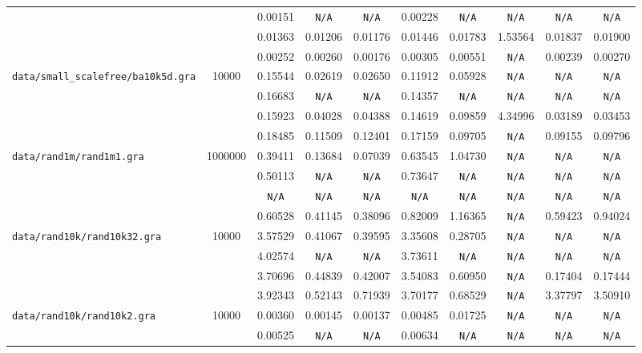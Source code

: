 \documentclass[12pt,a4paper,twoside]{article}
\begin{document}
{\begin{tabular}{ | l | c | c | c | c | c | c | c | c | c | }
\verb| | &  & 0.00151 & \verb|N/A| & \verb|N/A| & 0.00228 & \verb|N/A| & \verb|N/A| & \verb|N/A| & \verb|N/A| \\
\verb| | &  & 0.01363 & 0.01206 & 0.01176 & 0.01446 & 0.01783 & 1.53564 & 0.01837 & 0.01900 \\
\verb| | &  & 0.00252 & 0.00260 & 0.00176 & 0.00305 & 0.00551 & \verb|N/A| & 0.00239 & 0.00270 \\
\hline
\verb|data/small_scalefree/ba10k5d.gra| & 10000 & 0.15544 & 0.02619 & 0.02650 & 0.11912 & 0.05928 & \verb|N/A| & \verb|N/A| & \verb|N/A| \\
\verb| | &  & 0.16683 & \verb|N/A| & \verb|N/A| & 0.14357 & \verb|N/A| & \verb|N/A| & \verb|N/A| & \verb|N/A| \\
\verb| | &  & 0.15923 & 0.04028 & 0.04388 & 0.14619 & 0.09859 & 4.34996 & 0.03189 & 0.03453 \\
\verb| | &  & 0.18485 & 0.11509 & 0.12401 & 0.17159 & 0.09705 & \verb|N/A| & 0.09155 & 0.09796 \\
\hline
\verb|data/rand1m/rand1m1.gra| & 1000000 & 0.39411 & 0.13684 & 0.07039 & 0.63545 & 1.04730 & \verb|N/A| & \verb|N/A| & \verb|N/A| \\
\verb| | &  & 0.50113 & \verb|N/A| & \verb|N/A| & 0.73647 & \verb|N/A| & \verb|N/A| & \verb|N/A| & \verb|N/A| \\
\verb| | &  & \verb|N/A| & \verb|N/A| & \verb|N/A| & \verb|N/A| & \verb|N/A| & \verb|N/A| & \verb|N/A| & \verb|N/A| \\
\verb| | &  & 0.60528 & 0.41145 & 0.38096 & 0.82009 & 1.16365 & \verb|N/A| & 0.59423 & 0.94024 \\
\hline
\verb|data/rand10k/rand10k32.gra| & 10000 & 3.57529 & 0.41067 & 0.39595 & 3.35608 & 0.28705 & \verb|N/A| & \verb|N/A| & \verb|N/A| \\
\verb| | &  & 4.02574 & \verb|N/A| & \verb|N/A| & 3.73611 & \verb|N/A| & \verb|N/A| & \verb|N/A| & \verb|N/A| \\
\verb| | &  & 3.70696 & 0.44839 & 0.42007 & 3.54083 & 0.60950 & \verb|N/A| & 0.17404 & 0.17444 \\
\verb| | &  & 3.92343 & 0.52143 & 0.71939 & 3.70177 & 0.68529 & \verb|N/A| & 3.37797 & 3.50910 \\
\hline
\verb|data/rand10k/rand10k2.gra| & 10000 & 0.00360 & 0.00145 & 0.00137 & 0.00485 & 0.01725 & \verb|N/A| & \verb|N/A| & \verb|N/A| \\
\verb| | &  & 0.00525 & \verb|N/A| & \verb|N/A| & 0.00634 & \verb|N/A| & \verb|N/A| & \verb|N/A| & \verb|N/A| \\

\end{tabular}}
\end{document}
